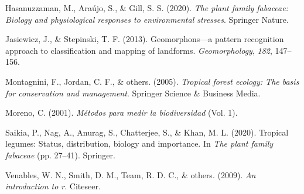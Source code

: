\documentclass[11pt,]{article}
\begin{document}
\hypertarget{ref-hasanuzzaman2020plant}{}
Hasanuzzaman, M., Araújo, S., \& Gill, S. S. (2020). \emph{The plant
family fabaceae: Biology and physiological responses to environmental
stresses}. Springer Nature.

\hypertarget{ref-jasiewicz2013geomorphons}{}
Jasiewicz, J., \& Stepinski, T. F. (2013). Geomorphons---a pattern
recognition approach to classification and mapping of landforms.
\emph{Geomorphology}, \emph{182}, 147--156.

\hypertarget{ref-montagnini2005tropical}{}
Montagnini, F., Jordan, C. F., \& others. (2005). \emph{Tropical forest
ecology: The basis for conservation and management}. Springer Science \&
Business Media.

\hypertarget{ref-Moreno2001}{}
Moreno, C. (2001). \emph{Métodos para medir la biodiversidad} (Vol. 1).

\hypertarget{ref-saikia2020tropical}{}
Saikia, P., Nag, A., Anurag, S., Chatterjee, S., \& Khan, M. L. (2020).
Tropical legumes: Status, distribution, biology and importance. In
\emph{The plant family fabaceae} (pp. 27--41). Springer.

\hypertarget{ref-venables2009introduction}{}
Venables, W. N., Smith, D. M., Team, R. D. C., \& others. (2009).
\emph{An introduction to r}. Citeseer.




\newpage
\singlespacing 
\end{document}
